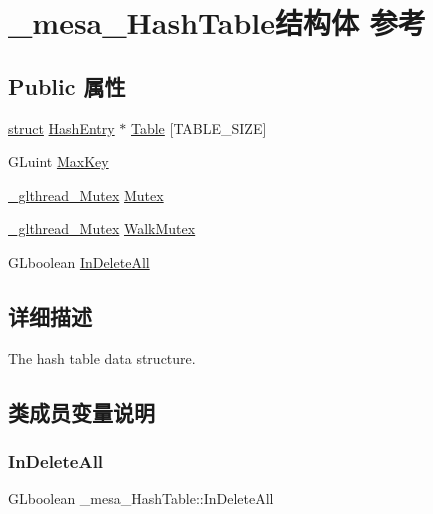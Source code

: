 \hypertarget{struct__mesa___hash_table}{}\section{\+\_\+mesa\+\_\+\+Hash\+Table结构体 参考}
\label{struct__mesa___hash_table}
\subsection*{Public 属性}
\begin{DoxyCompactItemize}
\item 
\hyperlink{interfacestruct}{struct} \hyperlink{struct_hash_entry}{Hash\+Entry} $\ast$ \hyperlink{struct__mesa___hash_table_a5c5aaee3d31a328ee25372f082cc897c}{Table} \mbox{[}T\+A\+B\+L\+E\+\_\+\+S\+I\+ZE\mbox{]}
\item 
G\+Luint \hyperlink{struct__mesa___hash_table_ad8cdb363b0f1ac2ae70b786c5f8b8388}{Max\+Key}
\item 
\hyperlink{struct___c_r_i_t_i_c_a_l___s_e_c_t_i_o_n}{\+\_\+glthread\+\_\+\+Mutex} \hyperlink{struct__mesa___hash_table_a9179e339890dce48511222a4904cacae}{Mutex}
\item 
\hyperlink{struct___c_r_i_t_i_c_a_l___s_e_c_t_i_o_n}{\+\_\+glthread\+\_\+\+Mutex} \hyperlink{struct__mesa___hash_table_a8b62d6daf861ae345a476413e1fac6d7}{Walk\+Mutex}
\item 
G\+Lboolean \hyperlink{struct__mesa___hash_table_a6a7463bd29df89b77f3f0b56795f3ca0}{In\+Delete\+All}
\end{DoxyCompactItemize}


\subsection{详细描述}
The hash table data structure. 

\subsection{类成员变量说明}
\mbox{\label{struct__mesa___hash_table_a6a7463bd29df89b77f3f0b56795f3ca0}} 
\subsubsection{\texorpdfstring{In\+Delete\+All}{InDeleteAll}}
{\footnotesize\ttfamily G\+Lboolean \+\_\+mesa\+\_\+\+Hash\+Table\+::\+In\+Delete\+All}

